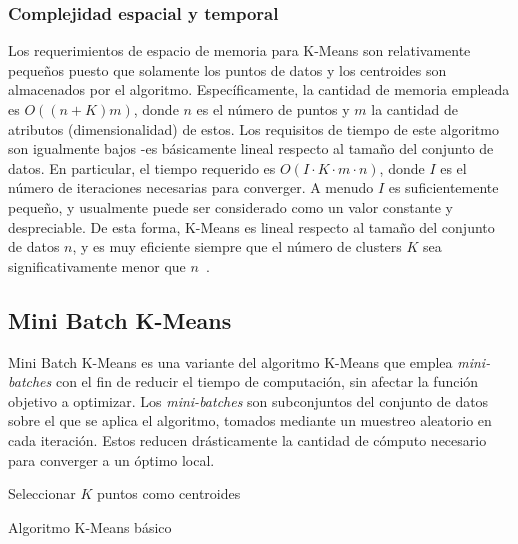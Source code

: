 \subsubsection{Complejidad espacial y temporal}

Los requerimientos de espacio de memoria para K-Means son relativamente pequeños puesto que solamente los puntos de datos y los centroides son almacenados por el algoritmo.
Específicamente, la cantidad de memoria empleada es $O((n+K)m)$, donde $n$ es el número de puntos y $m$ la cantidad de atributos (dimensionalidad) de estos.
Los requisitos de tiempo de este algoritmo son igualmente bajos -es básicamente lineal respecto al tamaño del conjunto de datos.
En particular, el tiempo requerido es $O(I \cdot K \cdot m \cdot n)$, donde $I$ es el número de iteraciones necesarias para converger.
A menudo $I$ es suficientemente pequeño, y usualmente puede ser considerado como un valor constante y despreciable.
De esta forma, K-Means es lineal respecto al tamaño del conjunto de datos $n$, y es muy eficiente siempre que el número de clusters $K$ sea significativamente menor que $n$~\cite{Unknown}.

%
%
%

\subsection{Mini Batch K-Means}\label{subsec:miniBatchKMeans}

Mini Batch K-Means es una variante del algoritmo K-Means que emplea \textit{mini-batches} con el fin de reducir el tiempo de computación, sin afectar la función objetivo a optimizar.
Los \textit{mini-batches} son subconjuntos del conjunto de datos sobre el que se aplica el algoritmo, tomados mediante un muestreo aleatorio en cada iteración.
Estos reducen drásticamente la cantidad de cómputo necesario para converger a un óptimo local.

\begin{algorithm}
    \label{algorithm:MiniBatchKMeans}
    Seleccionar $K$ puntos como centroides\;
    \caption{Algoritmo K-Means básico}
\end{algorithm}
